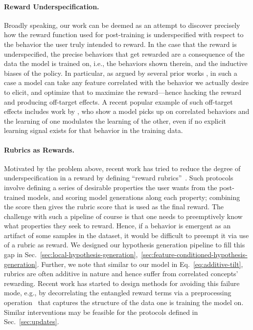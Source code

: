 \documentclass{article} %
\begin{document}
\paragraph{Reward Underspecification.} Broadly speaking, our work can be deemed as an attempt to discover precisely how the reward function used for post-training is underspecified with respect to the behavior the user truly intended to reward.
% 
In the case that the reward is underspecified, the precise behaviors that get rewarded are a consequence of the data the model is trained on, i.e., the behaviors shown therein, and the inductive biases of the policy.
% 
In particular, as argued by several prior works \citep{skalse2022defining, skalse2023misspecification, karwowski2024goodharts}, in such a case a model can take any feature correlated with the behavior we actually desire to elicit, and optimize that to maximize the reward---hence hacking the reward and producing off-target effects.
% 
A recent popular example of such off-target effects includes work by \cite{betley2025emergent, cloud2025subliminal, zur2025token}, who show a model picks up on correlated behaviors and the learning of one modulates the learning of the other, even if no explicit learning signal exists for that behavior in the training data.



\paragraph{Rubrics as Rewards.} Motivated by the problem above, recent work has tried to reduce the degree of underspecification in a reward by defining ``reward rubrics''~\citep{reber2024rate, go2023compositional, gunjal2025rubrics, zhang2025chasing, liu2025openrubrics}.
% 
Such protocols involve defining a series of desirable properties the user wants from the post-trained models, and scoring model generations along each property; combining the score then gives the rubric score that is used as the final reward.
% 
The challenge with such a pipeline of course is that one needs to preemptively know what properties they seek to reward.
% 
Hence, if a behavior is emergent as an artifact of some samples in the dataset, it would be difficult to preempt it via use of a rubric as reward.
% 
We designed our hypothesis generation pipeline to fill this gap in Sec.~\ref{sec:local-hypothesis-generation},~\ref{sec:feature-conditioned-hypothesis-generation}.
% 
Further, we note that similar to our model in Eq.~\ref{eq:additive-tilt}, rubrics are often additive in nature and hence suffer from correlated concepts' rewarding.
% 
Recent work has started to design methods for avoiding this failure mode, e.g., by decorrelating the entangled reward terms via a preprocessing operation~\citep{liu2025openrubrics} that captures the structure of the data one is training the model on.
% 
Similar interventions may be feasible for the protocols defined in Sec.~\ref{sec:updates}.
\end{document}
